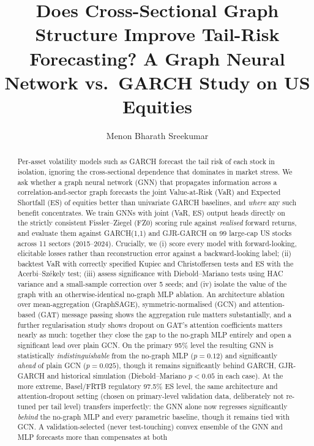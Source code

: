 \documentclass{llncs}
\title{Does Cross-Sectional Graph Structure Improve Tail-Risk
Forecasting? A Graph Neural Network vs.\ GARCH Study on US Equities}
\author{Menon Bharath Sreekumar}
\institute{Nanyang Technological University, Singapore\\ \email{BHARATH007@e.ntu.edu.sg}}
\newcommand{\nStocks}{99}
\newcommand{\nSectors}{11}
\newcommand{\nSeeds}{5}
\begin{document}
\maketitle

\begin{abstract}
Per-asset volatility models such as GARCH forecast the tail risk of each stock
in isolation, ignoring the cross-sectional dependence that dominates in market
stress. We ask whether a graph neural network (GNN) that propagates information
across a correlation-and-sector graph forecasts the joint Value-at-Risk (VaR)
and Expected Shortfall (ES) of equities better than univariate GARCH baselines,
and \emph{where} any such benefit concentrates. We train GNNs with joint
(VaR, ES) output heads directly on the strictly consistent Fissler--Ziegel (FZ0)
scoring rule against \emph{realised} forward returns, and evaluate them against
GARCH(1,1) and GJR-GARCH on \nStocks{} large-cap US stocks across \nSectors{}
sectors (2015--2024). Crucially, we (i) score every model with forward-looking,
elicitable losses rather than reconstruction error against a backward-looking
label; (ii) backtest VaR with correctly specified Kupiec and Christoffersen
tests and ES with the Acerbi--Sz\'ekely test; (iii) assess significance with
Diebold--Mariano tests using HAC variance and a small-sample correction over
\nSeeds{} seeds; and (iv) isolate the value of the graph with an
otherwise-identical no-graph MLP ablation. An architecture ablation over
mean-aggregation (GraphSAGE), symmetric-normalised (GCN) and attention-based
(GAT) message passing shows the aggregation rule matters substantially, and a
further regularisation study shows dropout on GAT's attention coefficients
matters nearly as much: together they close the gap to the no-graph MLP
entirely and open a significant lead over plain GCN. On the primary 95\% level
the resulting GNN is statistically \emph{indistinguishable} from the no-graph
MLP ($p=0.12$) and significantly \emph{ahead} of plain GCN ($p=0.025$), though
it remains significantly behind GARCH, GJR-GARCH and historical simulation
(Diebold--Mariano $p<0.05$ in each case). At the more extreme, Basel/FRTB
regulatory 97.5\% ES level, the same architecture and attention-dropout
setting (chosen on primary-level validation data, deliberately not re-tuned
per tail level) transfers imperfectly: the GNN alone now regresses
significantly \emph{behind} the no-graph MLP and every parametric baseline,
though it remains tied with GCN. A validation-selected (never test-touching)
convex ensemble of the GNN and MLP forecasts more than compensates at both

\end{abstract}
\end{document}
